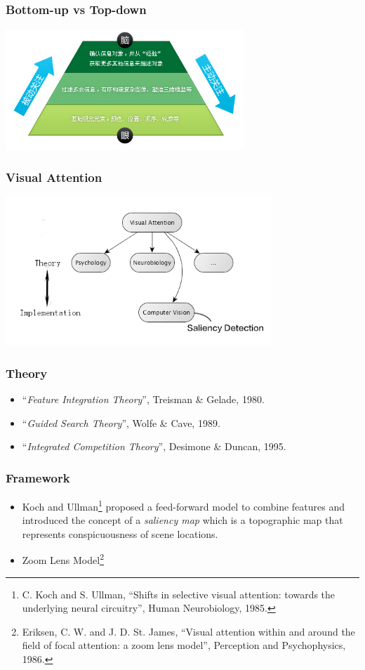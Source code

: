 \documentclass[notheorems,serif,table,compress]{beamer}  %
\begin{document}
\begin{frame}
\frametitle{Bottom-up vs Top-down}
\centering\includegraphics[width=9cm]{BottomupTopdown.png}
\end{frame}


\begin{frame}
\frametitle{Visual Attention}
\centering\includegraphics[width=10cm]{fields.png}
\end{frame}


\begin{frame}
\frametitle{Theory}
\begin{itemize}
\item ``{\color{blue}\emph{Feature Integration Theory}}'', Treisman \& Gelade, 1980.
\item ``{\color{blue}\emph{Guided Search Theory}}'', Wolfe \& Cave, 1989.
\item ``{\color{blue}\emph{Integrated Competition Theory}}'', Desimone \& Duncan, 1995.
\end{itemize}
\end{frame}


\begin{frame}
\frametitle{Framework}
\begin{itemize}
\item Koch and Ullman\footnote{C. Koch and S. Ullman, ``Shifts in selective visual attention: towards the underlying neural circuitry'', Human Neurobiology, 1985.} proposed a feed-forward model to combine features and introduced the concept of a {\color{blue}\emph{saliency map}} which is a topographic map that represents conspicuousness of scene locations.
\item Zoom Lens Model\footnote{Eriksen, C. W. and J. D. St. James, ``Visual attention within and around the field of focal attention: a zoom lens model'', Perception and Psychophysics, 1986.}
\end{itemize}
\end{frame}
\end{document}
